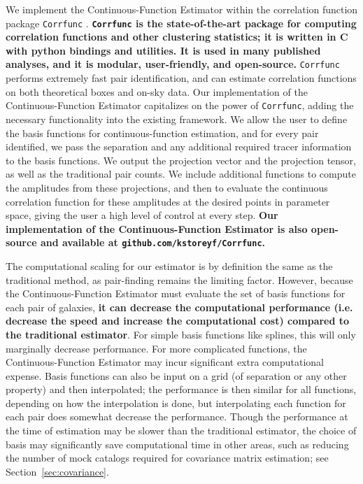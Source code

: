 \documentclass[modern]{aastex62}
\newcommand{\est}{the Continuous-Function Estimator\xspace}
\newcommand{\new}[1]{\textbf{#1}}
\begin{document}
We implement \est within the correlation function package \texttt{Corrfunc} \citep{Sinha2019}.
\new{\texttt{Corrfunc} is the state-of-the-art package for computing correlation functions and other clustering statistics; it is written in C with python bindings and utilities.
It is used in many published analyses, and it is modular, user-friendly, and open-source.}
\texttt{Corrfunc} performs extremely fast pair identification, and can estimate correlation functions on both theoretical boxes and on-sky data.
Our implementation of \est capitalizes on the power of \texttt{Corrfunc}, adding the necessary functionality into the existing framework.
We allow the user to define the basis functions for continuous-function estimation, and for every pair identified, we pass the separation and any additional required tracer information to the basis functions.
We output the projection vector and the projection tensor, as well as the traditional pair counts.
We include additional functions to compute the amplitudes from these projections, and then to evaluate the continuous correlation function for these amplitudes at the desired points in parameter space, giving the user a high level of control at every step.
\new{Our implementation of \est is also open-source and available at \texttt{github.com/kstoreyf/Corrfunc}.}

The computational scaling for our estimator is by definition the same as the traditional method, as pair-finding remains the limiting factor.
However, because \est must evaluate the set of basis functions for each pair of galaxies, \new{it can decrease the computational performance (i.e. decrease the speed and increase the computational cost) compared to the traditional estimator}.
For simple basis functions like splines, this will only marginally decrease performance.
For more complicated functions, \est may incur significant extra computational expense.
Basis functions can also be input on a grid (of separation or any other property) and then interpolated; the performance is then similar for all functions, depending on how the interpolation is done, but interpolating each function for each pair does somewhat decrease the performance.
Though the performance at the time of estimation may be slower than the traditional estimator, the choice of basis may significantly save computational time in other areas, such as reducing the number of mock catalogs required for covariance matrix estimation; see Section~\ref{sec:covariance}.
\end{document}
